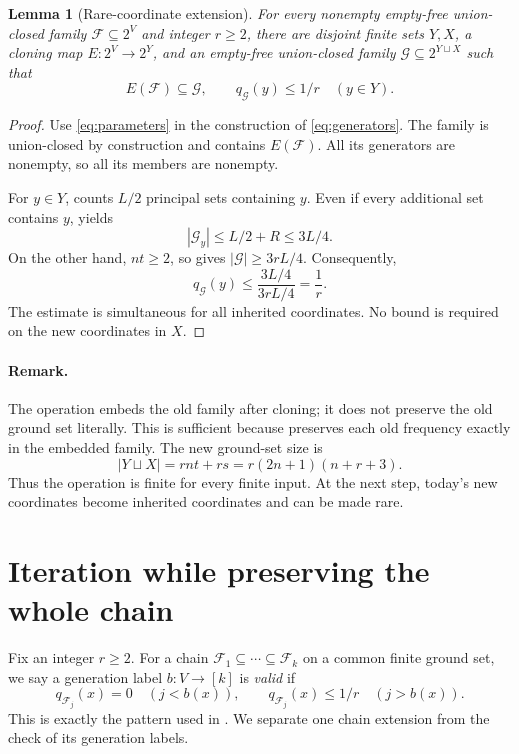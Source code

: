 \documentclass[11pt]{article}
\newtheorem{lemma}[lemma]{Lemma}
\newcommand{\<}{\langle}
\renewcommand{\>}{\rangle}
\newcommand{\F}{\mathcal{F}}
\newcommand{\G}{\mathcal{G}}
\numberwithin{equation}{section}
\begin{document}
\begin{lemma}[Rare-coordinate extension]\label{lem:extension}
For every nonempty empty-free union-closed family $\F\subseteq2^V$ and
integer $r\ge2$, there are disjoint finite sets $Y,X$, a cloning map
$E:2^V\to2^Y$, and an empty-free union-closed family $\G\subseteq2^{Y\sqcup X}$
such that
\begin{equation}\label{eq:extension}
 E(\F)\subseteq\G,\qquad q_\G(y)\le1/r\quad(y\in Y).
\end{equation}
\end{lemma}
\begin{proof}
Use \eqref{eq:parameters} in the construction of \eqref{eq:generators}.
The family is union-closed by construction and contains $E(\F)$. All its
generators are nonempty, so all its members are nonempty.

For $y\in Y$,  counts $L/2$ principal sets
containing $y$. Even if every additional set contains $y$,
 yields
\[
 |\G_y|\le L/2+R\le3L/4.
\]
On the other hand, $nt\ge2$, so  gives
$|\G|\ge3rL/4$. Consequently,
\[
 q_\G(y)\le\frac{3L/4}{3rL/4}=\frac1r.
\]
The estimate is simultaneous for all inherited coordinates. No bound is
required on the new coordinates in $X$.
\end{proof}

\paragraph{Remark.} The operation embeds the old family after cloning; it does not preserve the old ground set literally. This is sufficient because
 preserves each old frequency exactly in the
embedded family. The new ground-set size is
\begin{equation}\label{eq:one-step-size}
 |Y\sqcup X|=rnt+rs=r(2n+1)(n+r+3).
\end{equation}
Thus the operation is finite for every finite input. At the next step,
today's new coordinates become inherited coordinates and can be made rare.


\section{Iteration while preserving the whole chain}\label{sec:iterating}
Fix an integer $r \geq 2$. For a chain $\F_1\subseteq\cdots\subseteq\F_k$ on a common
finite ground set, we say a generation label $b:V\to[k]$ is \emph{valid} if
\begin{equation}\label{eq:valid-labels}
 q_{\F_j}(x)=0\quad(j<b(x)),\qquad
 q_{\F_j}(x)\le1/r\quad(j>b(x)).
\end{equation}
This is exactly the pattern used in .
We separate one chain extension from the check of its generation labels.
\end{document}
